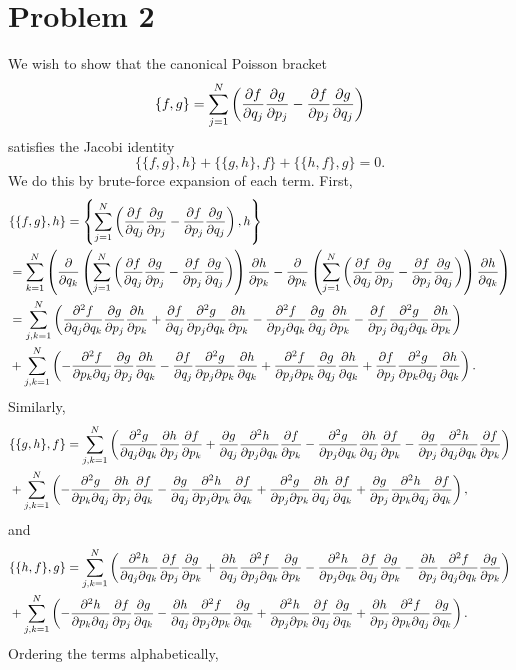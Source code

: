 \documentclass{article}
\begin{document}
\section{Problem 2}
We wish to show that the canonical Poisson bracket
$$\{f,g\}=\sum_{j=1}^N \left(\pp{f}{q_j}\pp{g}{p_j}-
\pp{f}{p_j}\pp{g}{q_j}\right)
$$
satisfies the Jacobi identity
$$
\{\{f,g\},h\}+\{\{g,h\},f\}+\{\{h,f\},g\}=0.
$$
We do this by brute-force expansion of each term. First,
\begin{align*}
&\{\{f,g\},h\}=\left\{\sum_{j=1}^N \left(\pp{f}{q_j}\pp{g}{p_j}-
\pp{f}{p_j}\pp{g}{q_j}\right),h\right\}\\&=
\sum_{k=1}^N \left(\pp{}{q_k}\left(\sum_{j=1}^N \left(\pp{f}{q_j}\pp{g}{p_j}-
\pp{f}{p_j}\pp{g}{q_j}\right)\right)\pp{h}{p_k}-
\pp{}{p_k}\left(\sum_{j=1}^N \left(\pp{f}{q_j}\pp{g}{p_j}-
\pp{f}{p_j}\pp{g}{q_j}\right)\right)\pp{h}{q_k}\right)\\&=
\sum_{j,k=1}^{N}\left(\ppm{f}{q_j}{q_k}\pp{g}{p_j}\pp{h}{p_k}+\pp{f}{q_j}\ppm{g}{p_j}{q_k}\pp{h}{p_k}-
\ppm{f}{p_j}{q_k}\pp{g}{q_j}\pp{h}{p_k}-\pp{f}{p_j}\ppm{g}{q_j}{q_k}\pp{h}{p_k}\right)\\&+
\sum_{j,k=1}^{N}\left(-\ppm{f}{p_k}{q_j}\pp{g}{p_j}\pp{h}{q_k}-\pp{f}{q_j}\ppm{g}{p_j}{p_k}\pp{h}{q_k}+
\ppm{f}{p_j}{p_k}\pp{g}{q_j}\pp{h}{q_k}+\pp{f}{p_j}\ppm{g}{p_k}{q_j}\pp{h}{q_k}\right).
\end{align*}
Similarly,
\begin{align*}
	&\{\{g,h\},f\}=\sum_{j,k=1}^{N}\left(\ppm{g}{q_j}{q_k}\pp{h}{p_j}\pp{f}{p_k}+\pp{g}{q_j}\ppm{h}{p_j}{q_k}\pp{f}{p_k}-
	\ppm{g}{p_j}{q_k}\pp{h}{q_j}\pp{f}{p_k}-\pp{g}{p_j}\ppm{h}{q_j}{q_k}\pp{f}{p_k}\right)\\&+
	\sum_{j,k=1}^{N}\left(-\ppm{g}{p_k}{q_j}\pp{h}{p_j}\pp{f}{q_k}-\pp{g}{q_j}\ppm{h}{p_j}{p_k}\pp{f}{q_k}+
	\ppm{g}{p_j}{p_k}\pp{h}{q_j}\pp{f}{q_k}+\pp{g}{p_j}\ppm{h}{p_k}{q_j}\pp{f}{q_k}\right),
\end{align*}
and
\begin{align*}
&\{\{h,f\},g\}=\sum_{j,k=1}^{N}\left(\ppm{h}{q_j}{q_k}\pp{f}{p_j}\pp{g}{p_k}+\pp{h}{q_j}\ppm{f}{p_j}{q_k}\pp{g}{p_k}-
\ppm{h}{p_j}{q_k}\pp{f}{q_j}\pp{g}{p_k}-\pp{h}{p_j}\ppm{f}{q_j}{q_k}\pp{g}{p_k}\right)\\&+
\sum_{j,k=1}^{N}\left(-\ppm{h}{p_k}{q_j}\pp{f}{p_j}\pp{g}{q_k}-\pp{h}{q_j}\ppm{f}{p_j}{p_k}\pp{g}{q_k}+
\ppm{h}{p_j}{p_k}\pp{f}{q_j}\pp{g}{q_k}+\pp{h}{p_j}\ppm{f}{p_k}{q_j}\pp{g}{q_k}\right).
\end{align*}
Ordering the terms alphabetically,
\end{document}
